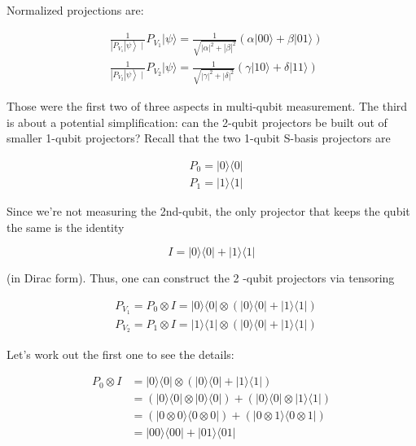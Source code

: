 \documentclass[main.tex]{subfiles}
\begin{document}
    Normalized projections are:
    
    $$
    \begin{aligned}
    &\frac{1}{\left.\left|P_{V_{1}}\right| \psi\right\rangle \mid} P_{V_{1}}|\psi\rangle=\frac{1}{\sqrt{|\alpha|^{2}+|\beta|^{2}}}(\alpha|00\rangle+\beta|01\rangle) \\
    &\frac{1}{\left.\left|P_{V_{2}}\right| \psi\right\rangle \mid} P_{V_{2}}|\psi\rangle=\frac{1}{\sqrt{|\gamma|^{2}+|\delta|^{2}}}(\gamma|10\rangle+\delta|11\rangle)
    \end{aligned}
    $$
    
    Those were the first two of three aspects in multi-qubit measurement. The third is about a potential simplification: can the 2-qubit projectors be built out of smaller 1-qubit projectors? Recall that the two 1-qubit S-basis projectors are
    
    $$
    \begin{aligned}
    &P_{0}=|0\rangle\langle 0| \\
    &P_{1}=|1\rangle\langle 1|
    \end{aligned}
    $$
    
    Since we're not measuring the 2nd-qubit, the only projector that keeps the qubit the same is the identity
    
    $$
    I=|0\rangle\langle 0|+| 1\rangle\langle 1|
    $$

    (in Dirac form). Thus, one can construct the 2 -qubit projectors via tensoring
    
    $$
    \begin{aligned}
    &P_{V_{1}}=P_{0} \otimes I=|0\rangle\langle 0| \otimes(|0\rangle\langle 0|+| 1\rangle\langle 1|) \\
    &P_{V_{2}}=P_{1} \otimes I=|1\rangle\langle 1| \otimes(|0\rangle\langle 0|+| 1\rangle\langle 1|)
    \end{aligned}
    $$
    
    Let's work out the first one to see the details:
    
    $$
    \begin{aligned}
    P_{0} \otimes I &=|0\rangle\langle 0| \otimes(|0\rangle\langle 0|+| 1\rangle\langle 1|) \\
    &=(|0\rangle\langle 0|\otimes| 0\rangle\langle 0|)+(|0\rangle\langle 0|\otimes| 1\rangle\langle 1|) \\
    &=(|0 \otimes 0\rangle\langle 0 \otimes 0|)+(|0 \otimes 1\rangle\langle 0 \otimes 1|) \\
    &=|00\rangle\langle 00|+| 01\rangle\langle 01|
    \end{aligned}
    $$
    
\end{document}
